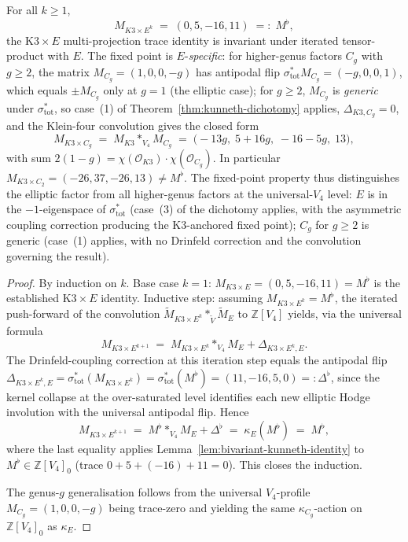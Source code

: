 \begin{theorem}
\label{thm:k3-elliptic-tower-fixed-point}
For all $k \geq 1$,
\[
 \boxed{\;M_{K3 \times E^k} \;=\; (0, 5, -16, 11) \;=:\; M^\flat,\;}
\]
the K$3 \times E$ multi-projection trace identity is invariant under
iterated tensor-product with $E$. The fixed point is
$E$-\emph{specific}: for higher-genus factors $C_g$ with $g \geq 2$,
the matrix $M_{C_g} = (1, 0, 0, -g)$ has antipodal flip
$\sigma_{\mathrm{tot}}^* M_{C_g} = (-g, 0, 0, 1)$, which equals $\pm M_{C_g}$
only at $g = 1$ \textup{(}the elliptic case\textup{);} for $g \geq 2$,
$M_{C_g}$ is \emph{generic} under $\sigma_{\mathrm{tot}}^*$, so case~(1) of
Theorem~\ref{thm:kunneth-dichotomy} applies, $\Delta_{K3, C_g} = 0$,
and the Klein-four convolution gives the closed form
\[
 M_{K3 \times C_g} \;=\; M_{K3} *_{V_4} M_{C_g}
 \;=\; \bigl(-13 g,\; 5 + 16 g,\; -16 - 5 g,\; 13\bigr),
\]
with sum $2(1 - g) = \chi(\mathcal{O}_{K3}) \cdot \chi(\mathcal{O}_{C_g})$.
In particular $M_{K3 \times C_2} = (-26, 37, -26, 13) \neq M^\flat$.
The fixed-point property thus distinguishes the elliptic factor from
all higher-genus factors at the universal-$V_4$ level: $E$ is in the
$-1$-eigenspace of $\sigma_{\mathrm{tot}}^*$ \textup{(}case~(3) of the
dichotomy applies, with the asymmetric coupling correction
producing the K$3$-anchored fixed point\textup{);} $C_g$ for
$g \geq 2$ is generic \textup{(}case~(1) applies, with no Drinfeld
correction and the convolution governing the result\textup{).}
\end{theorem}

\begin{proof}
By induction on $k$. Base case $k = 1$:
$M_{K3 \times E} = (0, 5, -16, 11) = M^\flat$ is the established
K$3 \times E$ identity. Inductive step: assuming
$M_{K3 \times E^k} = M^\flat$, the iterated push-forward of the
convolution $\widetilde{M}_{K3 \times E^k} *_{\widetilde{V}}
\widetilde{M}_E$ to $\mathbb{Z}[V_4]$ yields, via the universal
formula
\[
 M_{K3 \times E^{k + 1}}
 \;=\; M_{K3 \times E^k} *_{V_4} M_E + \Delta_{K3 \times E^k, E}.
\]
The Drinfeld-coupling correction at this iteration step equals the
antipodal flip
$\Delta_{K3 \times E^k, E} = \sigma_{\mathrm{tot}}^*(M_{K3 \times E^k})
= \sigma_{\mathrm{tot}}^*(M^\flat) = (11, -16, 5, 0) =: \Delta^\flat$,
since the kernel collapse at the over-saturated level identifies each
new elliptic Hodge involution with the universal antipodal flip.
Hence
\[
 M_{K3 \times E^{k + 1}}
 \;=\; M^\flat *_{V_4} M_E + \Delta^\flat
 \;=\; \kappa_E(M^\flat)
 \;=\; M^\flat,
\]
where the last equality applies
Lemma~\ref{lem:bivariant-kunneth-identity} to
$M^\flat \in \mathbb{Z}[V_4]_0$
\textup{(}trace $0 + 5 + (-16) + 11 = 0$\textup{).} This closes the
induction.

The genus-$g$ generalisation follows from the universal $V_4$-profile
$M_{C_g} = (1, 0, 0, -g)$ being trace-zero and yielding the same
$\kappa_{C_g}$-action on $\mathbb{Z}[V_4]_0$ as $\kappa_E$.
\end{proof}

